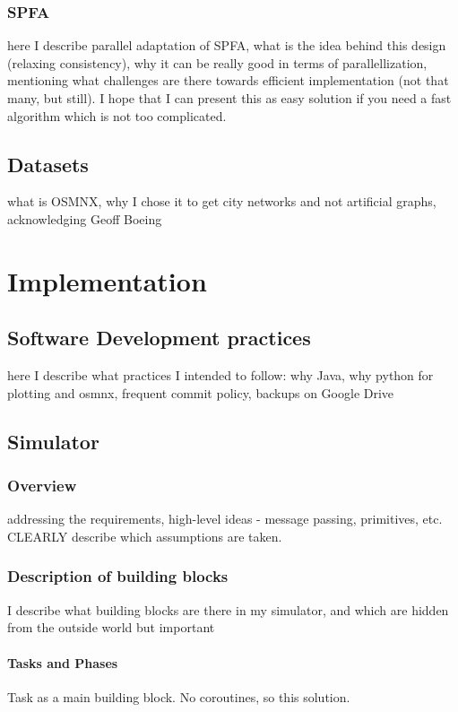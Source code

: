 \documentclass[12pt,a4paper,twoside,openright]{report}
\begin{document}
\subsection{SPFA}
here I describe parallel adaptation of SPFA, what is the idea behind this design (relaxing consistency), why it can be really good in terms of parallellization, mentioning what challenges are there towards efficient implementation (not that many, but still). I hope that I can present this as easy solution if you need a fast algorithm which is not too complicated.

\section{Datasets}
what is OSMNX, why I chose it to get city networks and not artificial graphs, acknowledging Geoff Boeing

\chapter{Implementation}
\section{Software Development practices}
here I describe what practices I intended to follow: why Java, why python for plotting and osmnx, frequent commit policy, backups on Google Drive

\section{Simulator}

\subsection{Overview}
addressing the requirements, high-level ideas - message passing, primitives, etc. CLEARLY describe which assumptions are taken.

\subsection{Description of building blocks}
I describe what building blocks are there in my simulator, and which are hidden from the outside world but important

\subsubsection{Tasks and Phases}
Task as a main building block. No coroutines, so this solution.
\end{document}
